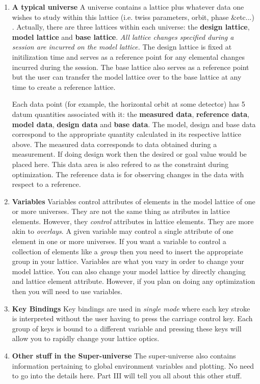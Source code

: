 \begin{enumerate}

\item \textbf{A typical universe} \Newline
A universe contains a \bmad lattice plus whatever data one wishes to study
within this lattice (i.e. twiss parameters, orbit, phase \&etc...) . Actually,
there are three lattices within each universe: the \textbf{design
lattice}, \textbf{model lattice} and \textbf{base lattice}. \emph{All lattice changes
specified during a \tao session are incurred on the model lattice.} The design lattice is
fixed at initilization time and serves as a reference point for any elemental
changes incurred during the \tao session. The base lattice also serves as a
reference point but the user can transfer the model lattice over to the base
lattice at any time to create a reference lattice.

Each data point (for example, the horizontal orbit at some detector) has 5 datum
 quantities associated with it: the \textbf{measured data}, \textbf{reference
data}, \textbf{model data}, \textbf{design data} and \textbf{base data}. The
model, design and base data correspond to the appropriate quantity
calculated in its respective lattice above. The measured data corresponds to 
data obtained during a measurement. If doing design work then the desired or
goal
value would be placed here. This data area is also refered to as the constraint during
optimization. The reference data is for observing changes in the data with
respect to a reference.

\item \textbf{Variables} \Newline
Variables control attributes of elements in the model lattice of one or more
universes. They are not the same thing as atributes in lattice elements.
However, they \textit{control} attributes in lattice elements. They are
more akin to \bmad \textit{overlays}. A given variable may control a single 
attribute of one element
in one or more universes. If you want a variable to control a collection of
elements like a \bmad \textit{group} then you need to insert the appropriate
group in your lattice. Variables are what you vary in order to change
your model lattice. You can also change your model lattice by directly changing
and lattice element attribute. However, if you plan on doing any optimization then 
you will need to use variables.

\item \textbf{Key Bindings} \Newline
Key bindings are used in \textit{single mode} where each key
stroke is interpreted without the user having to press the carriage control key.
Each group of keys is bound to a different variable and pressing these keys will
allow you to rapidly change your lattice optics.

\item \textbf{Other stuff in the Super-universe} \Newline
The super-universe also contains information pertaining to global environment variables and
plotting. No need to go into the details here. Part III will
tell you all about this other stuff.
\end{enumerate}

